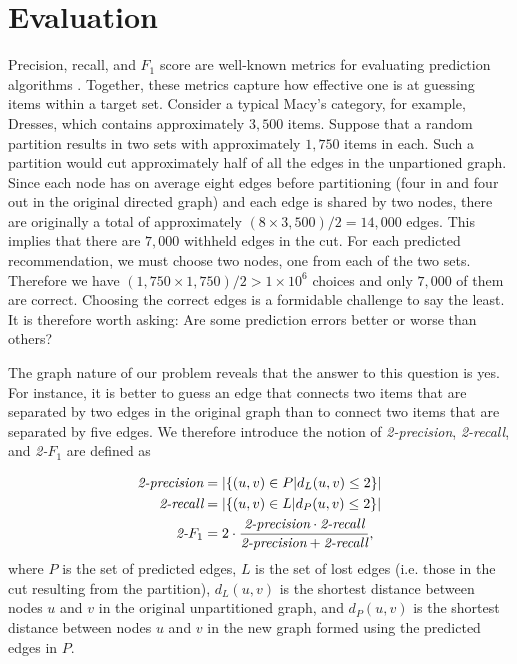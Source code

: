 \documentclass[11pt]{article}
\begin{document}
\section*{Evaluation}
Precision, recall, and $F_1$ score are well-known metrics for evaluating
prediction algorithms \cite{Powers2011}. Together, these metrics capture how
effective one is at guessing items within a target set. Consider a typical
Macy's category, for example, Dresses, which contains approximately $3,500$
items. Suppose that a random partition results in two sets with approximately
$1,750$ items in each. Such a partition would cut approximately half of all the
edges in the unpartioned graph. Since each node has on average eight edges
before partitioning (four in and four out in the original directed graph) and
each edge is shared by two nodes, there are originally a total of approximately
$\left(8 \times 3,500\right) / 2 = 14,000$ edges. This implies that there are
$7,000$ withheld edges in the cut. For each predicted recommendation, we must
choose two nodes, one from each of the two sets. Therefore we have $\left(1,750
\times 1,750\right)/2 > 1 \times 10^6$ choices and only $7,000$ of them are
correct. Choosing the correct edges is a formidable challenge to say the least.
It is therefore worth asking: Are some prediction errors better or worse than
others?

The graph nature of our problem reveals that the answer to this question is yes.
For instance, it is better to guess an edge that connects two items that are
separated by two edges in the original graph than to connect two items that are
separated by five edges. We therefore introduce the notion of {\em 2-precision},
{\em 2-recall}, and {\em 2-}$F_1$ are defined as

\begin{align}
\text{\em 2-precision} &= \left|\left\{(u,v) \in P | d_L(u,v) \leq 2
\right\}\right|
\\\text{\em 2-recall} &= \left|\left\{(u,v) \in L | d_P(u,v) \leq 2
\right\}\right|
\\\text{\em 2-}F_1 &= 2\cdot \frac{\text{\em 2-precision} \cdot \text{\em
2-recall}}{\text{\em 2-precision} + \text{\em 2-recall}},
\end{align}
where $P$ is the set of predicted edges, $L$ is the set of lost edges (i.e.
those in the cut resulting from the partition), $d_L(u,v)$ is the shortest
distance between nodes $u$ and $v$ in the original unpartitioned graph, and
$d_P(u,v)$ is the shortest distance between nodes $u$ and $v$ in the new graph
formed using the predicted edges in $P$.
\end{document}
